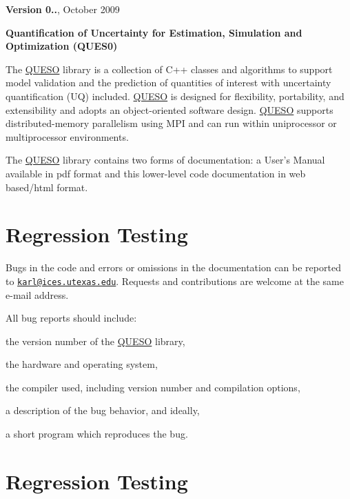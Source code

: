 {\bfseries Version 0..}, October 2009 



{\bfseries Quantification of Uncertainty for Estimation, Simulation and Optimization (Q\-U\-E\-S0) }

The \hyperlink{namespace_q_u_e_s_o}{Q\-U\-E\-S\-O} library is a collection of C++ classes and algorithms to support model validation and the prediction of quantities of interest with uncertainty quantification (U\-Q) included. \hyperlink{namespace_q_u_e_s_o}{Q\-U\-E\-S\-O} is designed for flexibility, portability, and extensibility and adopts an object-\/oriented software design. \hyperlink{namespace_q_u_e_s_o}{Q\-U\-E\-S\-O} supports distributed-\/memory parallelism using M\-P\-I and can run within uniprocessor or multiprocessor environments.

The \hyperlink{namespace_q_u_e_s_o}{Q\-U\-E\-S\-O} library contains two forms of documentation\-: a User's Manual available in pdf format and this lower-\/level code documentation in web based/html format.\hypertarget{index_bugs}{}\section{Regression Testing}\label{index_bugs}
Bugs in the code and errors or omissions in the documentation can be reported to \href{mailto:karl@ices.utexas.edu}{\tt karl@ices.\-utexas.\-edu}. Requests and contributions are welcome at the same e-\/mail address.

All bug reports should include\-: 
\begin{DoxyItemize}
\item the version number of the \hyperlink{namespace_q_u_e_s_o}{Q\-U\-E\-S\-O} library, 
\item the hardware and operating system, 
\item the compiler used, including version number and compilation options, 
\item a description of the bug behavior, and ideally, 
\item a short program which reproduces the bug. 
\end{DoxyItemize}\hypertarget{index_bugs}{}\section{Regression Testing}\label{index_bugs}

